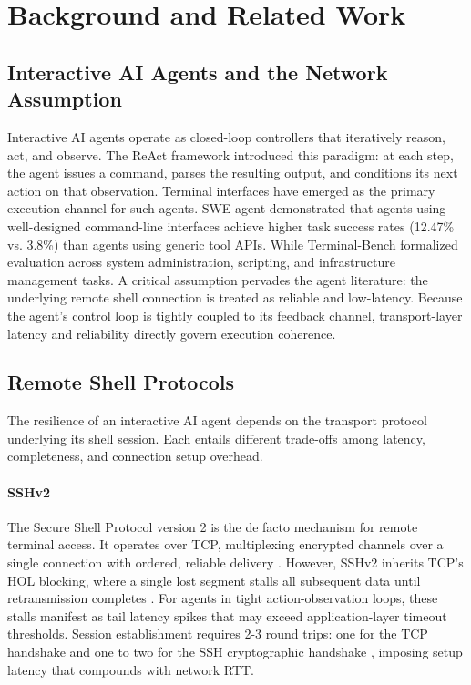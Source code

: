 \section{Background and Related Work}
\label{sec:background}

\subsection{Interactive AI Agents and the Network Assumption}
\label{sec:agents}

Interactive AI agents operate as closed-loop controllers that iteratively reason, act, and observe. The ReAct framework \cite{yao2023react} introduced this paradigm: at each step, the agent issues a command, parses the resulting output, and conditions its next action on that observation. Terminal interfaces have emerged as the primary execution channel for such agents. SWE-agent \cite{Yang2024} demonstrated that agents using well-designed command-line interfaces achieve higher task success rates (12.47\% vs. 3.8\%) than agents using generic tool APIs. While Terminal-Bench \cite{merrill2026} formalized evaluation across system administration, scripting, and infrastructure management tasks. A critical assumption pervades the agent literature: the underlying remote shell connection is treated as reliable and low-latency. Because the agent's control loop is tightly coupled to its feedback channel, transport-layer latency and reliability directly govern execution coherence.

\subsection{Remote Shell Protocols}
\label{subsec:protocols}

The resilience of an interactive AI agent depends on the transport protocol underlying its shell session. Each entails different trade-offs among latency, completeness, and connection setup overhead.

\paragraph{SSHv2}
The Secure Shell Protocol version 2 \cite{Ylonen2006RFC4251} is the de facto mechanism for remote terminal access. It operates over TCP, multiplexing encrypted channels over a single connection with ordered, reliable delivery \cite{Bellare2002}. However, SSHv2 inherits TCP's HOL blocking, where a single lost segment stalls all subsequent data until retransmission completes \cite{Scharf2007}. For agents in tight action-observation loops, these stalls manifest as tail latency spikes that may exceed application-layer timeout thresholds. Session establishment requires 2-3 round trips: one for the TCP handshake and one to two for the SSH cryptographic handshake \cite{Ylonen2006RFC4253}, imposing setup latency that compounds with network RTT.

